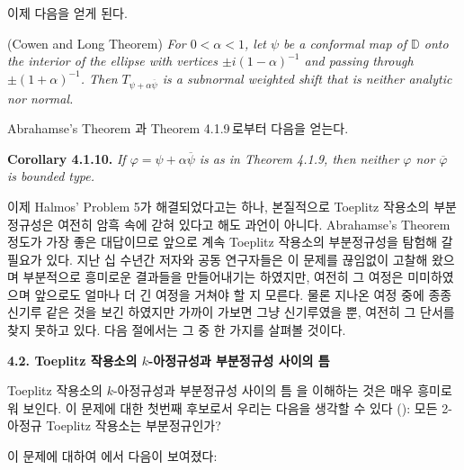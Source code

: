 \documentclass[12pt,a4paper,2sided]{article}
\begin{document}
이제 다음을 얻게 된다.

\vspace{.2 cm}{\bf Theorem 4.1.9.} (Cowen and Long Theorem) {\rm
\cite{CoL}} {\sl For $0<\alpha <1$, let $\psi$ be a conformal map of
$\mathbb{D}$ onto the interior of the ellipse with vertices $\pm
i(1-\alpha)^{-1}$ and passing through $\pm (1+\alpha)^{-1}$. Then
$T_{\psi +\alpha\overline{\psi}}$ is a subnormal weighted shift that
is neither analytic nor normal.}
\vspace{.2 cm}

Abrahamse's Theorem 과 Theorem 4.1.9\,로부터 다음을 얻는다.

\vspace{.2 cm}

\newpage{}\vspace{0.8cm}

{\bf Corollary 4.1.10.} {\sl If $\varphi=\psi
+\alpha\overline{\psi}$ is as in Theorem 4.1.9, then neither
$\varphi$ nor $\overline{\varphi}$ is bounded type.} \vspace{.2 cm}

이제 Halmos' Problem 5가 해결되었다고는 하나, 본질적으로 Toeplitz
작용소의 부분정규성은 여전히 암흑 속에 갇혀 있다고 해도 과언이
아니다. Abrahamse's Theorem 정도가 가장 좋은 대답이므로 앞으로 계속
Toeplitz 작용소의 부분정규성을 탐험해 갈 필요가 있다. 지난 십 수년간
저자와 공동 연구자들은 이 문제를 끊임없이 고찰해 왔으며 부분적으로
흥미로운 결과들을 만들어내기는 하였지만, 여전히 그 여정은
미미하였으며 앞으로도 얼마나 더 긴 여정을 거쳐야 할 지 모른다. 물론
지나온 여정 중에 종종 신기루 같은 것을 보긴 하였지만 가까이 가보면
그냥 신기루였을 뿐, 여전히 그 단서를 찾지 못하고 있다. 다음 절에서는
그 중 한 가지를 살펴볼 것이다.

\vspace{.3 cm} {\bf 4.2. Toeplitz 작용소의 $k$-아정규성과 부분정규성
사이의 틈}

\vspace{.3 cm} Toeplitz 작용소의 $k$-아정규성과 부분정규성 사이의 틈
을 이해하는 것은 매우 흥미로워 보인다. 이 문제에 대한 첫번째
후보로서 우리는 다음을 생각할 수 있다 (\cite{CuL1}): 모든 2-아정규
Toeplitz 작용소는 부분정규인가?

\medskip

이 문제에 대하여 \cite{CuL1}에서 다음이 보여졌다:
\end{document}

